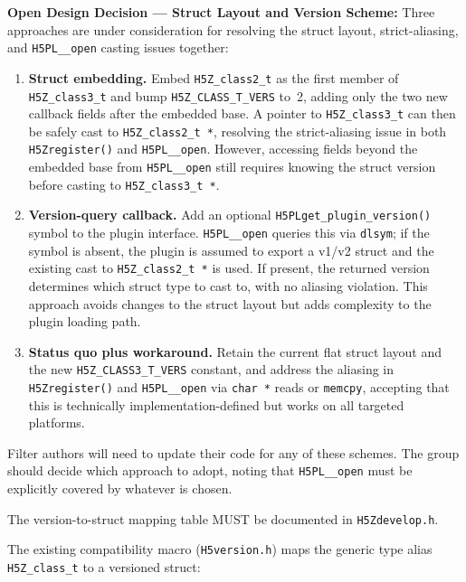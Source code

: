 \documentclass[../HDF5_RFC.tex]{subfiles}
\begin{document}
\noindent\colorbox{yellow!25}{\parbox{\dimexpr\linewidth-2\fboxsep}{%
  \textbf{Open Design Decision --- Struct Layout and Version Scheme:}
  Three approaches are under consideration for resolving the struct layout,
  strict-aliasing, and \texttt{H5PL\_\_open} casting issues together:
  \begin{enumerate}
    \item \textbf{Struct embedding.} Embed \texttt{H5Z\_class2\_t} as the first
          member of \texttt{H5Z\_class3\_t} and bump \texttt{H5Z\_CLASS\_T\_VERS} to~2,
          adding only the two new callback fields after the embedded base.
          A pointer to \texttt{H5Z\_class3\_t} can then be safely cast to
          \texttt{H5Z\_class2\_t~*}, resolving the strict-aliasing issue in both
          \texttt{H5Zregister()} and \texttt{H5PL\_\_open}.  However, accessing fields
          beyond the embedded base from \texttt{H5PL\_\_open} still requires knowing
          the struct version before casting to \texttt{H5Z\_class3\_t~*}.
    \item \textbf{Version-query callback.} Add an optional
          \texttt{H5PLget\_plugin\_version()} symbol to the plugin interface.
          \texttt{H5PL\_\_open} queries this via \texttt{dlsym}; if the symbol is absent,
          the plugin is assumed to export a v1/v2 struct and the existing cast
          to \texttt{H5Z\_class2\_t~*} is used.  If present, the returned version
          determines which struct type to cast to, with no aliasing violation.
          This approach avoids changes to the struct layout but adds complexity
          to the plugin loading path.
    \item \textbf{Status quo plus workaround.} Retain the current flat struct
          layout and the new \texttt{H5Z\_CLASS3\_T\_VERS} constant, and address the
          aliasing in \texttt{H5Zregister()} and \texttt{H5PL\_\_open} via
          \texttt{char~*} reads or \texttt{memcpy}, accepting that this is
          technically implementation-defined but works on all targeted platforms.
  \end{enumerate}
  Filter authors will need to update their code for any of these schemes.
  The group should decide which approach to adopt, noting that
  \texttt{H5PL\_\_open} must be explicitly covered by whatever is chosen.
}}

The version-to-struct mapping table MUST be documented in \texttt{H5Zdevelop.h}.

The existing compatibility macro
(\texttt{H5version.h}) maps the generic type alias \texttt{H5Z\_class\_t} to a versioned
struct:
\end{document}
